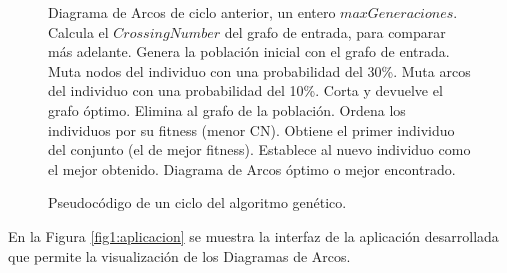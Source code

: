 	\begin{figure}
	    \begin{center}
		\begin{algorithmic}[1]
			\REQUIRE Diagrama de Arcos de ciclo anterior, un entero $maxGeneraciones$.
			\STATE Calcula el $CrossingNumber$ del grafo de entrada, para comparar más adelante.
			\STATE Genera la población inicial con el grafo de entrada.
			\STATE Muta nodos del individuo con una probabilidad del 30\%.
			\STATE Muta arcos del individuo con una probabilidad del 10\%.
			\STATE Corta y devuelve el grafo óptimo.
			\ELSE
			\STATE Elimina al grafo de la población.
			\ENDIF
			\ENDIF
			\ENDFOR
			\STATE Ordena los individuos por su fitness (menor CN).
			\STATE Obtiene el primer individuo del conjunto (el de mejor fitness).
			\STATE Establece al nuevo individuo como el mejor obtenido.
			\ENDIF
			\ENDIF
			\ENDWHILE
			\ENSURE Diagrama de Arcos óptimo o mejor encontrado.
		\end{algorithmic}
	    \end{center}
		\caption{Pseudocódigo de un ciclo del algoritmo genético.}
		\label{alg:genetico_ciclo}
	\end{figure}
En la  Figura \ref{fig1:aplicacion}  se muestra la interfaz  de la aplicación desarrollada  que permite la visualización de los Diagramas de Arcos.
